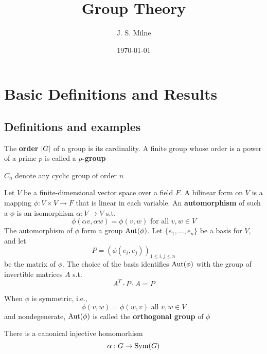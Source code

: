 \documentclass[11pt]{article}
\author{J. S. Milne}
\date{\today}
\title{Group Theory}
\begin{document}
\maketitle
\tableofcontents

\section{Basic Definitions and Results}
\label{sec:orgea006ba}
\subsection{Definitions and examples}
\label{sec:org62a7801}
The \textbf{order} \(\abs{G}\) of a group is its cardinality. A finite group whose order is a power of a
prime \(p\) is called a \textbf{\(p\)-group}

\(C_n\) denote any cyclic group of order \(n\)

\begin{examplle}[]
Let \(V\) be a finite-dimensional vector space over a field \(F\). A bilinear form on \(V\) is a
mapping \(\phi:V\times V\to F\) that is linear in each variable. An \textbf{automorphism} of such a \(\phi\) is an
isomorphism \(\alpha:V\to V\) s.t.
\begin{equation*}
\phi(\alpha v,\alpha w)=\phi(v,w)\text{ for all }v,w\in V
\end{equation*}
The automorphism of \(\phi\) form a group \(\operatorname{\text{Aut}}(\phi)\). Let \(\{e_1,\dots,e_n\}\) be a basis for \(V\), and let
\begin{equation*}
P=(\phi(e_i,e_j))_{1\le i,j\le n}
\end{equation*}
be the matrix of \(\phi\). The choice of the basis identifies \(\operatorname{\text{Aut}}(\phi)\) with the group of invertible
matrices \(A\) s.t.
\begin{equation*}
A^T\cdot P\cdot A=P
\end{equation*}

When \(\phi\) is symmetric, i.e.,
\begin{equation*}
\phi(v,w)=\phi(w,v)\text{ all }v,w\in V
\end{equation*}
and nondegenerate, \(\operatorname{\text{Aut}}(\phi)\) is called the \textbf{orthogonal group} of \(\phi\)
\end{examplle}

\begin{theorem}[Cayley]
There is a canonical injective homomorhism
\begin{equation*}
\alpha:G\to\operatorname{Sym}(G)
\end{equation*}
\end{theorem}
\end{document}
